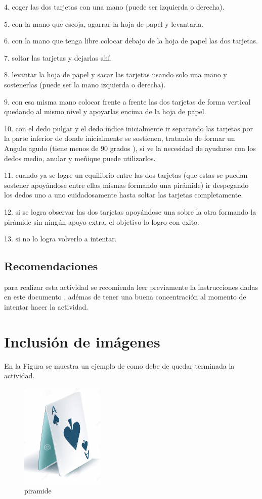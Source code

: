 \documentclass{article}
\begin{document}
4.	coger las dos tarjetas con una mano (puede ser izquierda o derecha).


5.	con la mano que escoja, agarrar la hoja de papel y levantarla.

6.	con la mano que tenga libre colocar debajo de la hoja de papel las dos tarjetas.


7.	soltar las tarjetas y dejarlas ahí.

8.	levantar la hoja de papel y sacar las tarjetas usando solo una mano y sostenerlas (puede ser la mano izquierda o derecha).


9.	con esa misma mano colocar frente a frente las dos tarjetas de forma vertical quedando al mismo nivel y apoyarlas encima de la hoja de papel.

10.	con el dedo pulgar y el dedo índice inicialmente ir separando las tarjetas por la parte inferior de donde inicialmente se sostienen, tratando de formar un Angulo agudo (tiene menos de 90 grados ), si ve la necesidad de ayudarse con los dedos medio, anular y meñique puede utilizarlos.


11.	 cuando ya se logre un equilibrio entre las dos tarjetas (que estas se puedan sostener apoyándose entre ellas mismas formando una pirámide) ir despegando los dedos uno a uno cuidadosamente hasta soltar las tarjetas completamente. 

12.	si se logra observar las dos tarjetas apoyándose una sobre la otra formando la pirámide sin ningún apoyo extra, el objetivo lo logro con exito. 


13.	si no lo logra volverlo a intentar. 



\subsection{Recomendaciones}
%
para realizar esta actividad se recomienda leer previamente la instrucciones dadas en este documento , adémas de tener una buena concentración al  momento de intentar hacer la actividad.


\section{Inclusión de imágenes} \label{imagenes}

En la Figura se muestra un ejemplo de como debe de quedar terminada la actividad.

\begin{figure}[h]
\includegraphics[width=4cm]{piramide.png}
\centering
\caption{piramide}
\label{fir:piramide}
\end{figure}


\label{imagenes}
\end{document}
